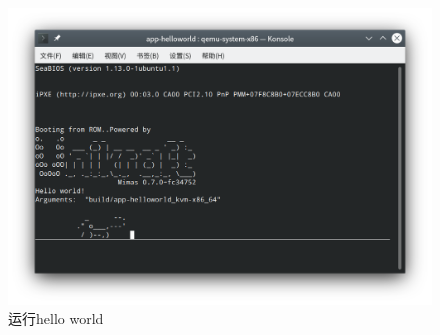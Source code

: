 \documentclass{../runikraft-report}
\begin{document}
\begin{figure}[tbh!]
\centering
\vspace*{-3ex}
\includegraphics[width=0.9\linewidth]{../assets/unikraft-run}
\vspace*{-3ex}
\caption{运行hello world}
\label{fig:unikraft-run}
\end{figure}
\end{document}

